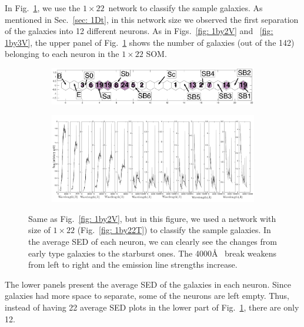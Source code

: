             In Fig.~\ref{fig: 1by22V}, we use the $1\times22$~network to classify the sample galaxies.
            As mentioned in Sec.~\ref{sec: 1Dt}, in this network size we observed the first separation of the  galaxies into 12 different neurons.
           As in Figs.~\ref{fig: 1by2V} and ~\ref{fig: 1by3V}, the upper panel of Fig.~\ref{fig: 1by22V} shows the number of galaxies (out of the 142) belonging to each neuron in the $1\times22$ SOM.
            \begin{figure}
                \begin{subfigure}[b]{0.9\textwidth}
                    \centering
                    \includegraphics[width=\textwidth]{images0.01/1d/hit_v_1_by_22_n.png}
                \end{subfigure}
                \hfill
                \begin{subfigure}[b]{0.9\textwidth}
                     \includegraphics[width=\textwidth]{images0.01/1d/SED_total1by22.png}
                \end{subfigure}
                \caption{Same as Fig.~\ref{fig: 1by2V}, but in this figure, we used a network with size of $1\times22$ (Fig.~\ref{fig: 1by22T}) to classify the sample galaxies. In the average SED of each neuron, we can clearly see the changes from early type galaxies to the starburst ones. The 4000\AA~ break weakens from left to right and the emission line strengths increase.}
                \label{fig: 1by22V}
            \end{figure}
            The lower panels present the average SED of the galaxies in each neuron.
            Since galaxies had more space to separate, some of the neurons are left empty.
            Thus, instead of having 22 average SED plots in the lower part of Fig.~\ref{fig: 1by22V}, there are only 12.
            
